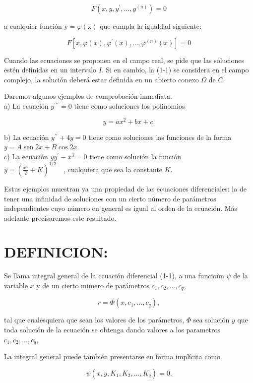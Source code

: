 \documentclass[10pt]{article}
\theoremstyle{plain}
\theoremstyle{definition}
\theoremstyle{remark}
\begin{document}
\begin{equation*}
F\left(x, y, y^{\prime}, \ldots, y^{(n)}\right)=0 \tag{1-1}
\end{equation*}


a cualquier función $\mathrm{y}=\varphi(\mathrm{x})$ que cumpla la igualdad siguiente:

$$
F\left[x, \varphi(x), \varphi^{\prime}(x), \ldots, \varphi^{(n)}(x)\right]=0
$$

Cuando las ecuaciones se proponen en el campo real, se pide que las soluciones estén definidas en un intervalo $I$. Si en cambio, la (1-1) se considera en el campo complejo, la solución deberá estar definida en un abierto conexo $\Omega$ de $C$.

Daremos algunos ejemplos de comprobación inmediata.\\
a) La ecuación $y^{\prime \prime \prime}=0$ tiene como soluciones los polinomios

$$
y=a x^{2}+b x+c .
$$

b) La ecuación $y^{\prime \prime}+4 y=0$ tiene como soluciones las funciones de la forma $y=A \operatorname{sen} 2 x+B \cos 2 x$.\\
c) La ecuación $y y^{\prime}-x^{3}=0$ tiene como solución la función\\
$y=\left(\frac{x^{4}}{2}+K\right)^{1 / 2} \quad$, cualquiera que sea la constante $K$.


Estus ejemplos muestran ya una propiedad de las ecuaciones diferenciales: la de tener una infinidad de soluciones con un cierto número de parámetros independientes cuyo número en general es igual al orden de la ecuación. Más adelante precisaremos este resultado.

\section*{DEFINICION:}
Se llama integral general de la ccuación diferencial (1-1), a una funcioùn $\psi$ de la variable $x$ y de un cierto mimero de parámetros $c_{1}, c_{2}, \ldots, c_{q}$,

$$
r=\Phi\left(x, c_{1}, \ldots, c_{q}\right),
$$

tal que cualesquiera que sean los valores de los parámetros, $\Phi$ sea solución $y$ que toda solución de la ecuación se obtenga dando valores a los parametros $c_{1}, c_{2}, \ldots, c_{q}$,

La integral general puede también presentarse en forma implícita como

$$
\psi\left(x, y, K_{1}, K_{2}, \ldots, K_{q}\right)=0 .
$$
\end{document}
